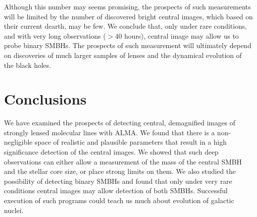 \documentclass[chicago]{emulateapj}
\begin{document}
  Although this number may seems promising, the prospects of such measurements will be limited by the number of discovered bright central images, which based on their current dearth, may be few. We conclude that, only under rare conditions, and with very long observations ($>40$ hours), central image may allow us to probe binary SMBHs. The prospects of such measurement will ultimately depend on discoveries of much larger samples of lenses and the dynamical evolution of the black holes.






\section{Conclusions}
We have examined the prospects of detecting central, demagnified images of strongly lensed molecular lines with ALMA. We found that there is a non-negligible space of realistic and plausible parameters that result in a high significance detection of the central images. We showed that such deep observations can either allow a measurement of the mass of the central SMBH and the stellar core size, or place strong limits on them.
We also studied the possibility of detecting binary SMBHs and found that only under very rare conditions central images may allow detection of both SMBHs. Successful execution of such programs could teach us much about evolution of galactic nuclei.








\end{document}
